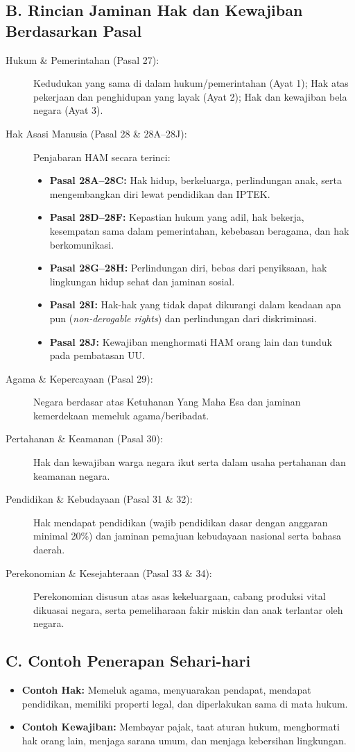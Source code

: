 \subsection{B. Rincian Jaminan Hak dan Kewajiban Berdasarkan Pasal}
\begin{description}
    \item[Hukum \& Pemerintahan (Pasal 27):] Kedudukan yang sama di dalam hukum/pemerintahan (Ayat 1); Hak atas pekerjaan dan penghidupan yang layak (Ayat 2); Hak dan kewajiban bela negara (Ayat 3).
    \item[Hak Asasi Manusia (Pasal 28 \& 28A--28J):] Penjabaran HAM secara terinci:
    \begin{itemize}
        \item \textbf{Pasal 28A--28C:} Hak hidup, berkeluarga, perlindungan anak, serta mengembangkan diri lewat pendidikan dan IPTEK.
        \item \textbf{Pasal 28D--28F:} Kepastian hukum yang adil, hak bekerja, kesempatan sama dalam pemerintahan, kebebasan beragama, dan hak berkomunikasi.
        \item \textbf{Pasal 28G--28H:} Perlindungan diri, bebas dari penyiksaan, hak lingkungan hidup sehat dan jaminan sosial.
        \item \textbf{Pasal 28I:} Hak-hak yang tidak dapat dikurangi dalam keadaan apa pun (\textit{non-derogable rights}) dan perlindungan dari diskriminasi.
        \item \textbf{Pasal 28J:} Kewajiban menghormati HAM orang lain dan tunduk pada pembatasan UU.
    \end{itemize}
    \item[Agama \& Kepercayaan (Pasal 29):] Negara berdasar atas Ketuhanan Yang Maha Esa dan jaminan kemerdekaan memeluk agama/beribadat.
    \item[Pertahanan \& Keamanan (Pasal 30):] Hak dan kewajiban warga negara ikut serta dalam usaha pertahanan dan keamanan negara.
    \item[Pendidikan \& Kebudayaan (Pasal 31 \& 32):] Hak mendapat pendidikan (wajib pendidikan dasar dengan anggaran minimal 20\%) dan jaminan pemajuan kebudayaan nasional serta bahasa daerah.
    \item[Perekonomian \& Kesejahteraan (Pasal 33 \& 34):] Perekonomian disusun atas asas kekeluargaan, cabang produksi vital dikuasai negara, serta pemeliharaan fakir miskin dan anak terlantar oleh negara.
\end{description}

\subsection{C. Contoh Penerapan Sehari-hari}
\begin{itemize}
    \item \textbf{Contoh Hak:} Memeluk agama, menyuarakan pendapat, mendapat pendidikan, memiliki properti legal, dan diperlakukan sama di mata hukum.
    \item \textbf{Contoh Kewajiban:} Membayar pajak, taat aturan hukum, menghormati hak orang lain, menjaga sarana umum, dan menjaga kebersihan lingkungan.
\end{itemize}